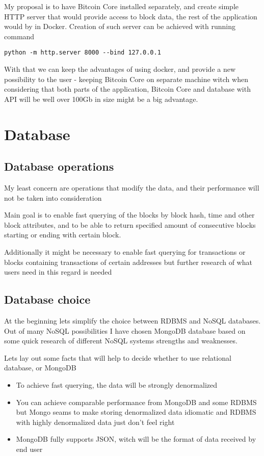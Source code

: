 \documentclass{article}
\begin{document}
My proposal is to have Bitcoin Core installed separately, and create simple HTTP server that would provide access to block data, the rest of the application would by in Docker. Creation of such server can be achieved with running command  
\begin{verbatim}
python -m http.server 8000 --bind 127.0.0.1
\end{verbatim}
With that we can keep the advantages of using docker, and provide a new possibility to the user - keeping Bitcoin Core on separate machine witch when considering that both parts of the application, Bitcoin Core and database with API will be well over 100Gb in size might be a big advantage.

\section{Database}
\subsection*{Database operations}
My least concern are operations that modify the data, and their performance will not be taken into consideration

Main goal is to enable fast querying of the blocks by block hash, time and other block attributes, and to be able to return specified amount of consecutive blocks starting or ending with certain block. 

Additionally it might be necessary to enable fast querying for transactions or blocks containing transactions of certain addresses but further research of what users need in this regard is needed

\subsection{Database choice}
At the beginning lets simplify the choice between RDBMS and NoSQL databases. Out of many NoSQL possibilities I have chosen MongoDB database based on some quick research of different NoSQL systems strengths and weaknesses.

Lets lay out some facts that will help to decide whether to use relational database, or MongoDB

\begin{itemize}
\item 
To achieve fast querying, the data will be strongly denormalized
\item 
You can achieve comparable performance from MongoDB and some RDBMS but Mongo seams to make storing denormalized data idiomatic and RDBMS with highly denormalized data just don't feel right
\item MongoDB fully supports JSON, witch will be the format of data received by end user
\end{itemize}
\end{document}
